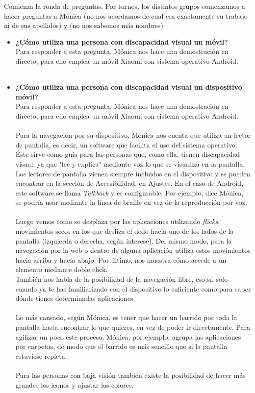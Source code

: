 \documentclass{article}
\begin{document}
	Comienza la ronda de preguntas. Por turnos, los distintos grupos comenzamos a hacer preguntas a Mónica (no nos acordamos de cual era exactamente su trabajo ni de sus apellidos) y (no nos sabemos más nombres)
	\\
	\begin{itemize}
		\item  \textbf{¿Cómo utiliza una persona con discapacidad visual un móvil?}
		\\
		Para responder a esta pregunta, Mónica nos hace una demostración en directo, para ello emplea un móvil Xiaomi con sistema operativo Android.
		\\
		\\
		\item  \textbf{¿Cómo utiliza una persona con discapacidad visual un dispositivo móvil?}
		\\
		Para responder a esta pregunta, Mónica nos hace una demostración en directo, para ello emplea un móvil Xiaomi con sistema operativo Android.
		\\
		\\
		Para la navegación por su dispositivo, Mónica nos cuenta que utiliza un lector de pantalla, es decir, un software que facilita el uso del sistema operativo. Éste sirve como guía para las personas que, como ella, tienen discapacidad visual, ya que "lee y explica" mediante voz lo que se visualiza en la pantalla. Los lectores de pantalla vienen siempre incluidos en el dispositivo y se pueden encontrar en la sección de Accesibilidad, en Ajustes. En el caso de Android, este software se llama \textit{Talkback} y es configurable. Por ejemplo, dice Mónica, se podría usar mediante la línea de braille en vez de la reproducción por voz.
		\\
		\\
		Luego vemos como se desplaza por las aplicaciones utilizando \textit{flicks}, movimientos secos en los que desliza el dedo hacia uno de los lados de la pantalla (izquierda o derecha, según interese). Del mismo modo, para la navegación por la web o dentro de alguna aplicación utiliza estos movimientos hacia arriba y hacia abajo. Por último, nos muestra cómo accede a un elemento mediante doble click. 
		\\
		También nos habla de la posibilidad de la navegación libre, eso sí, solo cuando ya te has familiarizado con el dispositivo lo suficiente como para saber dónde tienes determinadas aplicaciones. 
		\\
		\\
		Lo más cansado, según Mónica, es tener que hacer un barrido por toda la pantalla hasta encontrar lo que quieres, en vez de poder ir directamente. Para agilizar un poco este proceso, Mónica, por ejemplo, agrupa las aplicaciones por carpetas, de modo que el barrido es más sencillo que si la pantalla estuviese repleta.
		\\
		\\
		Para las personas con baja visión también existe la posibilidad de hacer más grandes los iconos y ajustar los colores.
		\\
		

\end{itemize}
\end{document}
